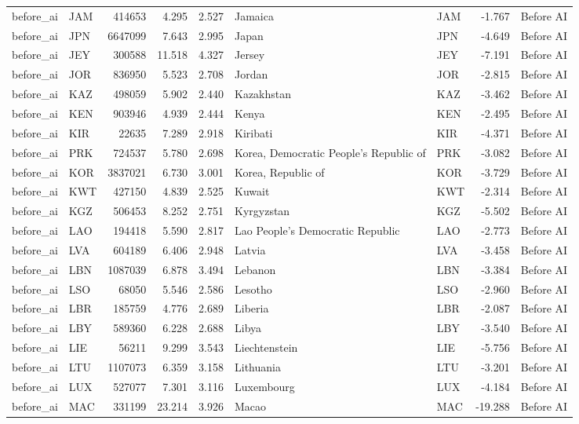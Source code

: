 \begin{tabular}{llrrrllrl}
before\_ai & JAM & 414653 & 4.295 & 2.527 & Jamaica & JAM & -1.767 & Before AI \\
before\_ai & JPN & 6647099 & 7.643 & 2.995 & Japan & JPN & -4.649 & Before AI \\
before\_ai & JEY & 300588 & 11.518 & 4.327 & Jersey & JEY & -7.191 & Before AI \\
before\_ai & JOR & 836950 & 5.523 & 2.708 & Jordan & JOR & -2.815 & Before AI \\
before\_ai & KAZ & 498059 & 5.902 & 2.440 & Kazakhstan & KAZ & -3.462 & Before AI \\
before\_ai & KEN & 903946 & 4.939 & 2.444 & Kenya & KEN & -2.495 & Before AI \\
before\_ai & KIR & 22635 & 7.289 & 2.918 & Kiribati & KIR & -4.371 & Before AI \\
before\_ai & PRK & 724537 & 5.780 & 2.698 & Korea, Democratic People's Republic of & PRK & -3.082 & Before AI \\
before\_ai & KOR & 3837021 & 6.730 & 3.001 & Korea, Republic of & KOR & -3.729 & Before AI \\
before\_ai & KWT & 427150 & 4.839 & 2.525 & Kuwait & KWT & -2.314 & Before AI \\
before\_ai & KGZ & 506453 & 8.252 & 2.751 & Kyrgyzstan & KGZ & -5.502 & Before AI \\
before\_ai & LAO & 194418 & 5.590 & 2.817 & Lao People's Democratic Republic & LAO & -2.773 & Before AI \\
before\_ai & LVA & 604189 & 6.406 & 2.948 & Latvia & LVA & -3.458 & Before AI \\
before\_ai & LBN & 1087039 & 6.878 & 3.494 & Lebanon & LBN & -3.384 & Before AI \\
before\_ai & LSO & 68050 & 5.546 & 2.586 & Lesotho & LSO & -2.960 & Before AI \\
before\_ai & LBR & 185759 & 4.776 & 2.689 & Liberia & LBR & -2.087 & Before AI \\
before\_ai & LBY & 589360 & 6.228 & 2.688 & Libya & LBY & -3.540 & Before AI \\
before\_ai & LIE & 56211 & 9.299 & 3.543 & Liechtenstein & LIE & -5.756 & Before AI \\
before\_ai & LTU & 1107073 & 6.359 & 3.158 & Lithuania & LTU & -3.201 & Before AI \\
before\_ai & LUX & 527077 & 7.301 & 3.116 & Luxembourg & LUX & -4.184 & Before AI \\
before\_ai & MAC & 331199 & 23.214 & 3.926 & Macao & MAC & -19.288 & Before AI \\

\end{tabular}
